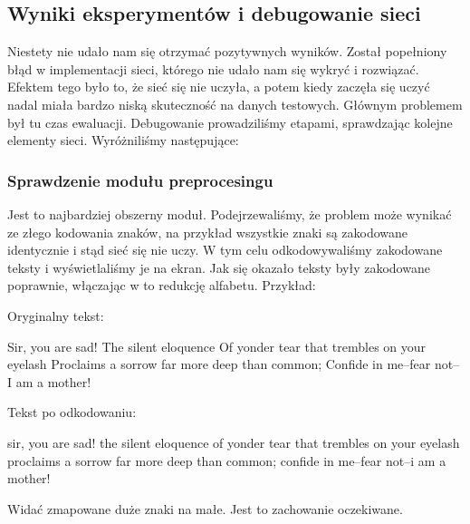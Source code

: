 \subsection{Wyniki eksperymentów i debugowanie sieci}
Niestety nie udało nam się otrzymać pozytywnych wyników. Został popełniony błąd w implementacji sieci,
którego nie udało nam się wykryć i rozwiązać. Efektem tego było to, że sieć się nie uczyła, a potem kiedy zaczęła się 
uczyć nadal miała bardzo niską skuteczność na danych testowych. Głównym problemem był tu czas ewaluacji. 
Debugowanie prowadziliśmy etapami, sprawdzając kolejne elementy sieci. Wyróżniliśmy następujące:

\subsubsection{Sprawdzenie modułu preprocesingu}
	Jest to najbardziej obszerny moduł. Podejrzewaliśmy, że problem może wynikać ze złego kodowania znaków,
	na przykład wszystkie znaki są zakodowane identycznie i stąd sieć się nie uczy. W tym celu odkodowywaliśmy
	zakodowane teksty i wyświetlaliśmy je na ekran. Jak się okazało teksty były zakodowane poprawnie, włączając w
	to redukcję alfabetu. Przykład:
	
	Oryginalny tekst:
	\begin{bash}
 Sir, you are sad! The silent eloquence
 Of yonder tear that trembles on your eyelash
 Proclaims a sorrow far more deep than common;
 Confide in me--fear not--I am a mother!
	\end{bash}
	
	Tekst po odkodowaniu: 
	\begin{bash}
sir, you are sad! the silent eloquence
of yonder tear that trembles on your eyelash
proclaims a sorrow far more deep than common;
confide in me--fear not--i am a mother!
	\end{bash}
	Widać zmapowane duże znaki na małe. Jest to zachowanie oczekiwane.
	
